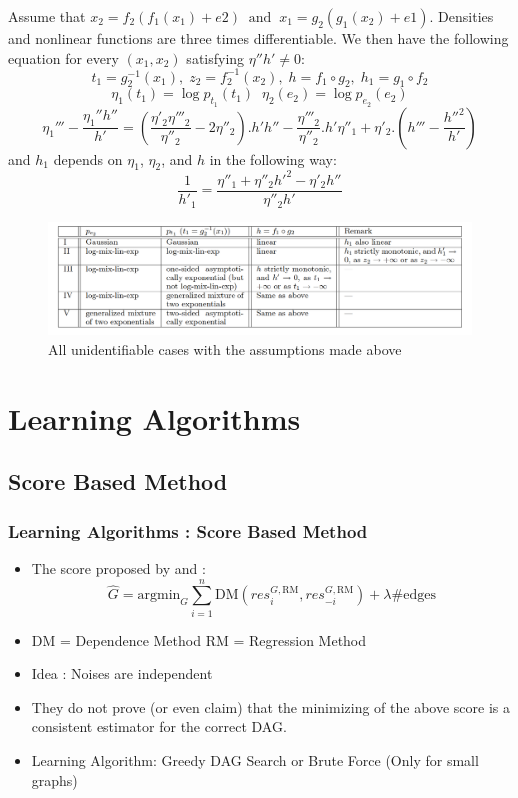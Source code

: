 \documentclass{beamer}
\begin{document}
\begin{frame}
\begin{theorem}
\begin{small}
Assume that $x_2 = f_2(f_1(x_1) + e2) \;\;\mathrm{and} \;\;x_1 = g_2(g_1(x_2) + e1)$.
 Densities and nonlinear functions are three times differentiable. We then have the following equation for every $(x_1, x_2)$ satisfying $\eta''h'\neq 0$:
 $$t_1 = g_2^{-1}(x_1),\; z_2 = f_2^{-1}(x_2),\; h = f_1\circ g_2,\; h_1 = g_1 \circ f_2$$
 $$\eta_1(t_1) = \log p_{t_1}(t_1) \;\; \eta_2(e_2) = \log p_{e_2}(e_2)$$
 $$\eta_1''' - \frac{\eta_1'' h''}{h'} = (\frac{\eta'_2 \eta'''_2}{\eta''_2} - 2 \eta''_2).h' h'' - \frac{\eta'''_2}{\eta''_2}.h'\eta''_1 + \eta'_2.(h'''-\frac{h''^2}{h'})$$
 and  $h_1$ depends on $\eta_1$, $\eta_2$, and $h$ in the following way:
 $$\frac{1}{h'_1} = \frac{\eta''_1 + \eta''_2h'^2-\eta'_2h''}{\eta''_2h'}$$
\end{small}
\end{theorem}
\end{frame}
\begin{frame}
\begin{figure}
	\centering
	\includegraphics[scale=0.2]{PNL.png}
	\caption{All unidentifiable cases with the assumptions made above}
\end{figure}
\end{frame}

\section{Learning Algorithms}
\subsection{Score Based Method}
\begin{frame}
\frametitle{Learning Algorithms : Score Based Method}
\begin{itemize}
\item The score proposed by \cite{continous} and \cite{nowzohour}:
$$\hat{G} = \mathrm{argmin}_G \sum_{i=1}^n \mathrm{DM}(res_i^{G, \mathrm{RM}}, res_{-i}^{G, \mathrm{RM}}) + \lambda \#\mathrm{edges}$$
\item DM = Dependence Method \hspace{1cm} RM = Regression Method
\item Idea : Noises are independent
\item They do not prove (or even claim) that the minimizing of the above score is a consistent estimator for the correct DAG.
\item Learning Algorithm: Greedy DAG Search or Brute Force (Only for small graphs)
\end{itemize}
\end{frame}
\end{document}
